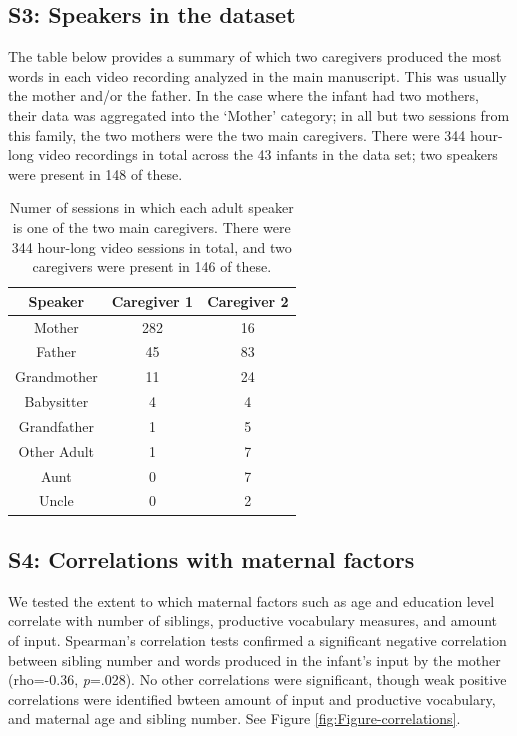 \documentclass[
  man,mask,floatsintext]{apa6}
\begin{document}
\newpage

\hypertarget{s3-speakers-in-the-dataset}{%
\subsection{S3: Speakers in the dataset}\label{s3-speakers-in-the-dataset}}

The table below provides a summary of which two caregivers produced the most words in each video recording analyzed in the main manuscript. This was usually the mother and/or the father. In the case where the infant had two mothers, their data was aggregated into the `Mother' category; in all but two sessions from this family, the two mothers were the two main caregivers. There were 344 hour-long video recordings in total across the 43 infants in the data set; two speakers were present in 148 of these.

\begin{longtable}[t]{ccc}
\caption{\label{tab:table-speakers-sessions}Numer of sessions in which each adult speaker is one of the two main caregivers. There were 344 hour-long video sessions in total, and two caregivers were present in 146 of these.}\\
\toprule
Speaker & Caregiver 1 & Caregiver 2\\
\midrule
Mother & 282 & 16\\
Father & 45 & 83\\
Grandmother & 11 & 24\\
Babysitter & 4 & 4\\
Grandfather & 1 & 5\\
\addlinespace
Other Adult & 1 & 7\\
Aunt & 0 & 7\\
Uncle & 0 & 2\\
\bottomrule
\end{longtable}

\newpage

\hypertarget{s4-correlations-with-maternal-factors}{%
\subsection{S4: Correlations with maternal factors}\label{s4-correlations-with-maternal-factors}}

We tested the extent to which maternal factors such as age and education level correlate with number of siblings, productive vocabulary measures, and amount of input. Spearman's correlation tests confirmed a significant negative correlation between sibling number and words produced in the infant's input by the mother (rho=-0.36, \emph{p}=.028). No other correlations were significant, though weak positive correlations were identified bwteen amount of input and productive vocabulary, and maternal age and sibling number. See Figure \ref{fig:Figure-correlations}.
\end{document}
